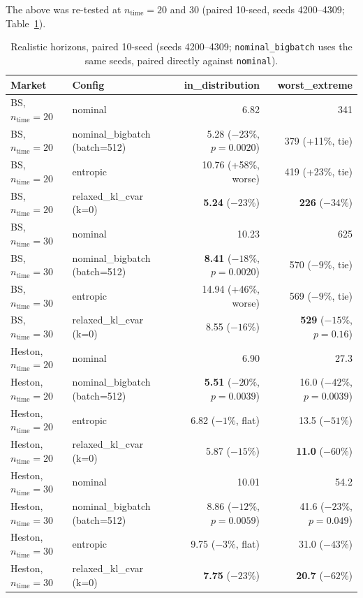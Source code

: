 \documentclass[11pt]{article}
\begin{document}
The above was re-tested at $n_{\mathrm{time}}=20$ and $30$ (paired 10-seed, seeds 4200--4309;
Table~\ref{tab:longer}).

\begin{table}[h]
  \centering
  \caption{Realistic horizons, paired 10-seed (seeds 4200--4309; \texttt{nominal\_bigbatch} uses
  the same seeds, paired directly against \texttt{nominal}).}
  \label{tab:longer}
  \small
  \begin{tabular}{@{}llrr@{}}
    \toprule
    Market & Config & in\_distribution & worst\_extreme \\
    \midrule
    BS, $n_{\mathrm{time}}=20$ & nominal & 6.82 & 341 \\
    BS, $n_{\mathrm{time}}=20$ & nominal\_bigbatch (batch=512) & 5.28 ($-23\%$, $p=0.0020$) & 379 (+11\%, tie) \\
    BS, $n_{\mathrm{time}}=20$ & entropic & 10.76 (+58\%, worse) & 419 (+23\%, tie) \\
    BS, $n_{\mathrm{time}}=20$ & relaxed\_kl\_cvar (k=0) & \textbf{5.24} ($-23\%$) & \textbf{226} ($-34\%$) \\
    \addlinespace
    BS, $n_{\mathrm{time}}=30$ & nominal & 10.23 & 625 \\
    BS, $n_{\mathrm{time}}=30$ & nominal\_bigbatch (batch=512) & \textbf{8.41} ($-18\%$, $p=0.0020$) & 570 ($-9\%$, tie) \\
    BS, $n_{\mathrm{time}}=30$ & entropic & 14.94 (+46\%, worse) & 569 ($-9\%$, tie) \\
    BS, $n_{\mathrm{time}}=30$ & relaxed\_kl\_cvar (k=0) & 8.55 ($-16\%$) & \textbf{529} ($-15\%$, $p=0.16$) \\
    \addlinespace
    Heston, $n_{\mathrm{time}}=20$ & nominal & 6.90 & 27.3 \\
    Heston, $n_{\mathrm{time}}=20$ & nominal\_bigbatch (batch=512) & \textbf{5.51} ($-20\%$, $p=0.0039$) & 16.0 ($-42\%$, $p=0.0039$) \\
    Heston, $n_{\mathrm{time}}=20$ & entropic & 6.82 ($-1\%$, flat) & 13.5 ($-51\%$) \\
    Heston, $n_{\mathrm{time}}=20$ & relaxed\_kl\_cvar (k=0) & 5.87 ($-15\%$) & \textbf{11.0} ($-60\%$) \\
    \addlinespace
    Heston, $n_{\mathrm{time}}=30$ & nominal & 10.01 & 54.2 \\
    Heston, $n_{\mathrm{time}}=30$ & nominal\_bigbatch (batch=512) & 8.86 ($-12\%$, $p=0.0059$) & 41.6 ($-23\%$, $p=0.049$) \\
    Heston, $n_{\mathrm{time}}=30$ & entropic & 9.75 ($-3\%$, flat) & 31.0 ($-43\%$) \\
    Heston, $n_{\mathrm{time}}=30$ & relaxed\_kl\_cvar (k=0) & \textbf{7.75} ($-23\%$) & \textbf{20.7} ($-62\%$) \\
    \bottomrule
  \end{tabular}
\end{table}
\end{document}
